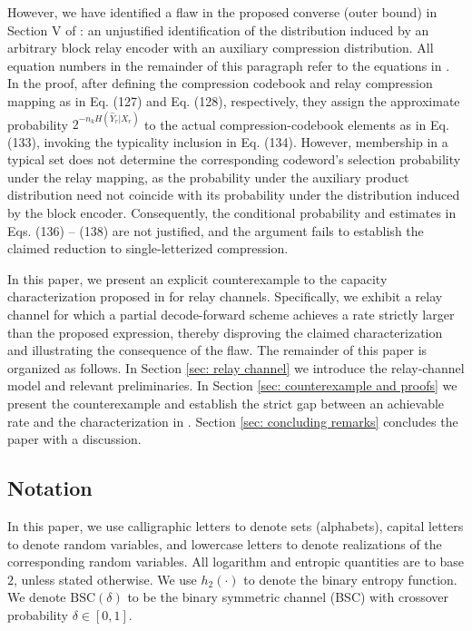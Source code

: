 \documentclass[12pt]{article}
\theoremstyle{definition}
\begin{document}
However, we have identified a flaw in the proposed converse (outer bound) in Section V of \cite{pon26}: an unjustified identification of the distribution induced by an arbitrary block relay encoder with an auxiliary compression distribution. All equation numbers in the remainder of this paragraph refer to the equations in \cite{pon26}. In the proof, after defining the compression codebook and relay compression mapping as in Eq. (127) and Eq. (128), respectively, they assign the approximate probability $2^{-n_k H(\hat{Y}_r |X_r)}$ to the actual compression-codebook elements as in Eq. (133), invoking the typicality inclusion in Eq. (134). However, membership in a typical set does not determine the corresponding codeword's selection probability under the relay mapping, as the probability under the auxiliary product distribution need not coincide with its probability under the distribution induced by the block encoder. Consequently, the conditional probability and estimates in Eqs. (136) -- (138) are not justified, and the argument fails to establish the claimed reduction to single-letterized compression.

In this paper, we present an explicit counterexample to the capacity characterization proposed in \cite{pon26} for relay channels. Specifically, we exhibit a relay channel for which a partial decode-forward scheme achieves a rate strictly larger than the proposed expression, thereby disproving the claimed characterization and illustrating the consequence of the flaw. The remainder of this paper is organized as follows. In Section \ref{sec: relay channel} we introduce the relay-channel model and relevant preliminaries. In Section \ref{sec: counterexample and proofs} we present the counterexample and establish the strict gap between an achievable rate and the characterization in \cite{pon26}. Section \ref{sec: concluding remarks} concludes the paper with a discussion.

\subsection*{Notation}
In this paper, we use calligraphic letters to denote sets (alphabets), capital letters to denote random variables, and lowercase letters to denote realizations of the corresponding random variables. All logarithm and entropic quantities are to base $2$, unless stated otherwise.
We use $h_2(\cdot)$ to denote the binary entropy function. We denote $\mathrm{BSC}(\delta)$ to be the binary symmetric channel (BSC) with crossover probability $\delta \in [0,1]$.
\end{document}
